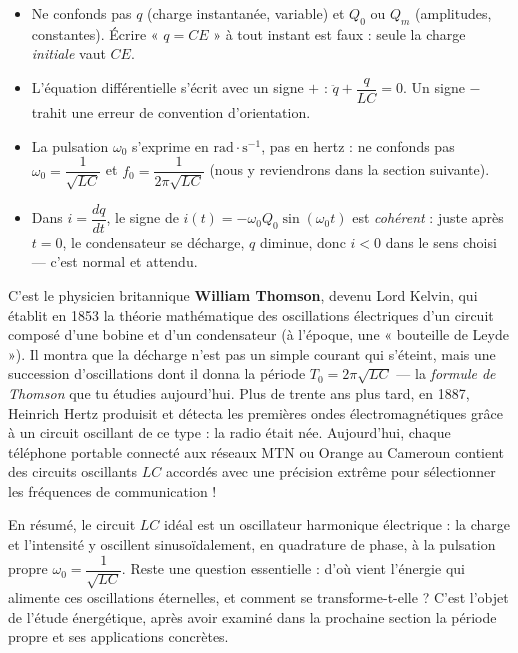 \documentclass[11pt]{article}
\begin{document}
\begin{attention}
\begin{itemize}
\item Ne confonds pas $q$ (charge instantanée, variable) et $Q_0$ ou $Q_m$ (amplitudes, constantes). Écrire « $q = CE$ » à tout instant est faux : seule la charge \emph{initiale} vaut $CE$.
\item L'équation différentielle s'écrit avec un signe $+$ : $\ddot{q} + \dfrac{q}{LC} = 0$. Un signe $-$ trahit une erreur de convention d'orientation.
\item La pulsation $\omega_0$ s'exprime en $\mathrm{rad\cdot s^{-1}}$, pas en hertz : ne confonds pas $\omega_0 = \dfrac{1}{\sqrt{LC}}$ et $f_0 = \dfrac{1}{2\pi\sqrt{LC}}$ (nous y reviendrons dans la section suivante).
\item Dans $i = \dfrac{dq}{dt}$, le signe de $i(t) = -\omega_0 Q_0\sin(\omega_0 t)$ est \emph{cohérent} : juste après $t = 0$, le condensateur se décharge, $q$ diminue, donc $i < 0$ dans le sens choisi — c'est normal et attendu.
\end{itemize}
\end{attention}

\begin{savaistu}
C'est le physicien britannique \textbf{William Thomson}, devenu Lord Kelvin, qui établit en 1853 la théorie mathématique des oscillations électriques d'un circuit composé d'une bobine et d'un condensateur (à l'époque, une « bouteille de Leyde »). Il montra que la décharge n'est pas un simple courant qui s'éteint, mais une succession d'oscillations dont il donna la période $T_0 = 2\pi\sqrt{LC}$ — la \emph{formule de Thomson} que tu étudies aujourd'hui. Plus de trente ans plus tard, en 1887, Heinrich Hertz produisit et détecta les premières ondes électromagnétiques grâce à un circuit oscillant de ce type : la radio était née. Aujourd'hui, chaque téléphone portable connecté aux réseaux MTN ou Orange au Cameroun contient des circuits oscillants $LC$ accordés avec une précision extrême pour sélectionner les fréquences de communication !
\end{savaistu}

En résumé, le circuit $LC$ idéal est un oscillateur harmonique électrique : la charge et l'intensité y oscillent sinusoïdalement, en quadrature de phase, à la pulsation propre $\omega_0 = \dfrac{1}{\sqrt{LC}}$. Reste une question essentielle : d'où vient l'énergie qui alimente ces oscillations éternelles, et comment se transforme-t-elle ? C'est l'objet de l'étude énergétique, après avoir examiné dans la prochaine section la période propre et ses applications concrètes.
\end{document}
